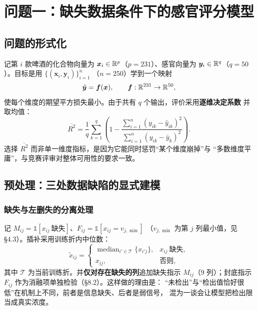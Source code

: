 \section{问题一：缺失数据条件下的感官评分模型}

\subsection{问题的形式化}

记第 $i$ 款啤酒的化合物向量为 $\bm{x}_i\in\mathbb{R}^{p}$（$p=231$）、感官向量为
$\bm{y}_i\in\mathbb{R}^{q}$（$q=50$）。目标是用 $\{(\bm{x}_i,\bm{y}_i)\}_{i=1}^{n}$
（$n=250$）学到一个映射
\begin{equation}
\hat{\bm{y}}=\bm{f}(\bm{x}),\qquad \bm{f}:\mathbb{R}^{231}\rightarrow\mathbb{R}^{50},
\label{eq:q1map}
\end{equation}
使每个维度的期望平方损失最小。由于共有 $q$ 个输出，评价采用\textbf{逐维决定系数}
并取均值：
\begin{equation}
\overline{R^{2}}=\frac{1}{q}\sum_{k=1}^{q}\left(1-\frac{\sum_{i=1}^{n}
(y_{ik}-\hat y_{ik})^{2}}{\sum_{i=1}^{n}(y_{ik}-\bar y_{k})^{2}}\right).
\label{eq:meanr2}
\end{equation}
选择 $\overline{R^{2}}$ 而非单一维度指标，是因为它能同时惩罚“某个维度崩掉”与
“多数维度平庸”，与竞赛评审对整体可用性的要求一致。

\subsection{预处理：三处数据缺陷的显式建模}

\subsubsection{缺失与左删失的分离处理}

记 $M_{ij}=\mathbb{1}[x_{ij}\ \text{缺失}]$、$F_{ij}=\mathbb{1}[x_{ij}=v_{j,\min}]$
（$v_{j,\min}$ 为第 $j$ 列最小值，见 \S4.3）。插补采用训练折内中位数：
\begin{equation}
\tilde x_{ij}=
\begin{cases}
\operatorname{median}_{i'\in\mathcal{T}}\{x_{i'j}\}, & x_{ij}\ \text{缺失},\\
x_{ij}, & \text{否则},
\end{cases}
\label{eq:impute}
\end{equation}
其中 $\mathcal{T}$ 为当前训练折。并\textbf{仅对存在缺失的列}追加缺失指示
$M_{ij}$（9 列）；封底指示 $F_{ij}$ 作为消融项单独检验（\S8.2）。这样做的理由是：
“未检出”与“检出值恰好很低”在机制上不同，前者是信息缺失、后者是弱信号，
混为一谈会让模型把检出限当成真实浓度。

